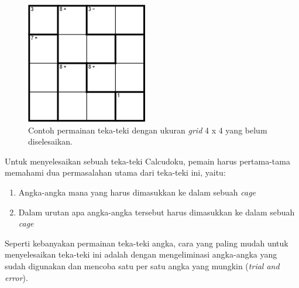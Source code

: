 \begin{figure}
\centering
\captionsetup{justification=centering}
\includegraphics[scale=1]{Gambar/Backtracking1}
\caption[Contoh permainan teka-teki Calcudoku dengan ukuran \textit{grid} 4 x 4 yang belum diselesaikan.  ~\cite{fahda:16:backtracking}]{Contoh permainan teka-teki dengan ukuran \textit{grid} 4 x 4 yang belum diselesaikan.  ~\cite{fahda:16:backtracking}}
\label{fig:backtracking1}
\end{figure}

Untuk menyelesaikan sebuah teka-teki Calcudoku, pemain harus pertama-tama memahami dua permasalahan utama dari teka-teki ini, yaitu:
\begin{enumerate}
\item Angka-angka mana yang harus dimasukkan ke dalam sebuah \textit{cage}
\item Dalam urutan apa angka-angka tersebut harus dimasukkan ke dalam sebuah \textit{cage}
\end{enumerate}

Seperti kebanyakan permainan teka-teki angka, cara yang paling mudah untuk menyelesaikan teka-teki ini adalah dengan mengeliminasi angka-angka yang sudah digunakan dan mencoba satu per satu angka yang mungkin (\textit{trial and error}). 

